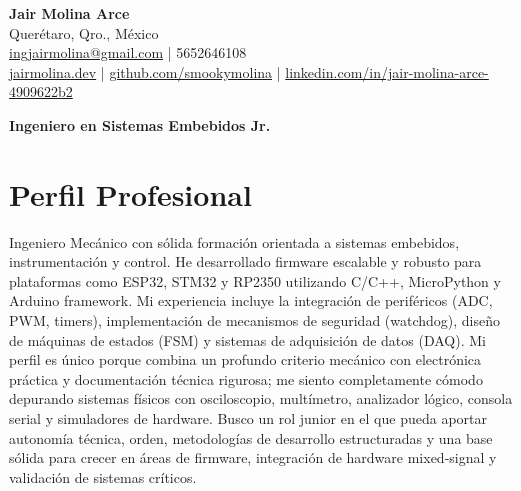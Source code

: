 \documentclass[10pt,letterpaper]{article}
\begin{document}
\begin{center}
    {\LARGE \textbf{Jair Molina Arce}} \\ \vspace{0.5ex}
    Querétaro, Qro., México \\
    \href{mailto:ingjairmolina@gmail.com}{ingjairmolina@gmail.com} | 5652646108 \\
    \href{https://jairmolina.dev}{jairmolina.dev} | \href{https://github.com/smookymolina}{github.com/smookymolina} | \href{https://linkedin.com/in/jair-molina-arce-4909622b2}{linkedin.com/in/jair-molina-arce-4909622b2}
\end{center}

\vspace{1ex}

\begin{center}
    {\Large \textbf{Ingeniero en Sistemas Embebidos Jr.}}
\end{center}

\section*{Perfil Profesional}
Ingeniero Mecánico con sólida formación orientada a sistemas embebidos, instrumentación y control. He desarrollado firmware escalable y robusto para plataformas como ESP32, STM32 y RP2350 utilizando C/C++, MicroPython y Arduino framework. Mi experiencia incluye la integración de periféricos (ADC, PWM, timers), implementación de mecanismos de seguridad (watchdog), diseño de máquinas de estados (FSM) y sistemas de adquisición de datos (DAQ). Mi perfil es único porque combina un profundo criterio mecánico con electrónica práctica y documentación técnica rigurosa; me siento completamente cómodo depurando sistemas físicos con osciloscopio, multímetro, analizador lógico, consola serial y simuladores de hardware. Busco un rol junior en el que pueda aportar autonomía técnica, orden, metodologías de desarrollo estructuradas y una base sólida para crecer en áreas de firmware, integración de hardware mixed-signal y validación de sistemas críticos.
\end{document}
